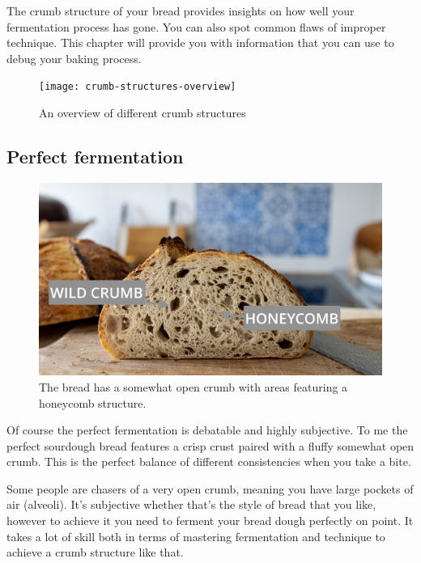 The crumb structure of your bread provides insights on how well
your fermentation process has gone. You can also spot common flaws
of improper technique. This chapter will provide you with information
that you can use to debug your baking process.

\begin{figure}
  \texttt{[image: crumb-structures-overview]}
  \caption{An overview of different crumb structures}
  \label{fig:crumb-structures-overview}
\end{figure}

\subsection{Perfect fermentation}

\begin{figure}
  \includegraphics[width=\textwidth]{open-crumb}
  \caption{The bread has a somewhat open crumb with areas
  featuring a honeycomb structure.}
  \label{fig:open-crumb}
\end{figure}

Of course the perfect fermentation is debatable and highly subjective. To
me the perfect sourdough bread features a crisp crust paired with a fluffy
somewhat open crumb. This is the perfect balance of different consistencies
when you take a bite.

Some people are chasers of a very open crumb, meaning you have large pockets
of air (alveoli). It's subjective whether that's the style of bread that you like,
however to achieve it you need to ferment your bread dough perfectly on point.
It takes a lot of skill both in terms of mastering fermentation and technique
to achieve a crumb structure like that.


